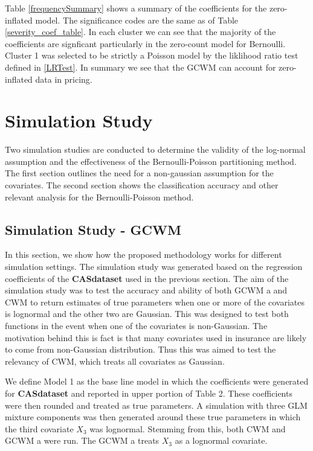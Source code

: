 \documentclass[11pt,letterpaper]{article}
\numberwithin{equation}{section}
\numberwithin{equation}{section}
\numberwithin{equation}{section}
\begin{document}
Table \ref{frequencySummary} shows a summary of the coefficients for the zero-inflated model. The
significance codes are the same as of Table \ref{severity_coef_table}. In each cluster we can see that the majority of the coefficients are signficant particularly in the zero-count model for Bernoulli. Cluster 1 was selected to be strictly a Poisson model by the liklihood ratio test defined in \eqref{LRTest}. In summary we see that the GCWM can account for zero-inflated data in pricing.


\section{Simulation Study}

Two simulation studies are conducted to determine the validity of the log-normal assumption and the effectiveness of the Bernoulli-Poisson partitioning method. The first section outlines the need for a non-gaussian assumption for the covariates. The second section shows the classification accuracy and other relevant analysis for the Bernoulli-Poisson method.


\subsection{Simulation Study - GCWM}


In this section, we show how the proposed methodology works for different simulation settings. The simulation study was generated based on the regression coefficients of the \textbf{CASdataset} used in the previous section. The aim of the simulation study was to test the accuracy and ability of both GCWM a and CWM to return estimates of true parameters when one or more of the covariates is lognormal and the other two are Gaussian. This was designed to test both functions in the event when one of the covariates is non-Gaussian. The motivation behind this is fact is that many covariates used in insurance are likely to come from non-Gaussian distribution. Thus this was aimed to test the relevancy of CWM, which treats all covariates as Gaussian.

We define Model 1 as the base line model in which the coefficients were generated for \textbf{CASdataset} and reported in upper portion of Table 2. These coefficients were then rounded and treated as true parameters. A simulation with three GLM mixture components was then generated around these true parameters in which the third covariate $X_3$ was lognormal. Stemming from this, both CWM and  GCWM a were run. The  GCWM a treats $X_3$ as a lognormal covariate. 
\end{document}
